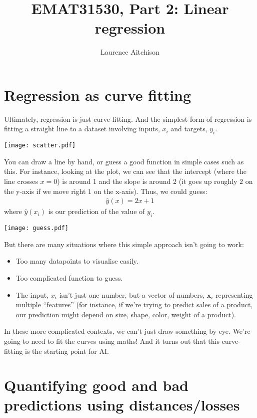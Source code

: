 \documentclass{article}
\title{EMAT31530, Part 2: Linear regression}
\author{Laurence Aitchison}
\date{}
\newcommand{\x}{\mathbf{x}}
\begin{document}
\maketitle

\section{Regression as curve fitting}
Ultimately, regression is just curve-fitting.
And the simplest form of regression is fitting a straight line to a dataset involving inputs, $x_i$ and targets, $y_i$.
\begin{center}
  \texttt{[image: scatter.pdf]}
\end{center}
You can draw a line by hand, or guess a good function in simple cases such as this.
For instance, looking at the plot, we can see that the intercept (where the line crosses $x=0$) is around 1 and the slope is around 2 (it goes up roughly $2$ on the y-axis if we move right $1$ on the x-axis).
Thus, we could guess:
\begin{align}
  \hat{y}(x) = 2 x + 1
\end{align}
where $\hat{y}(x_i)$ is our prediction of the value of $y_i$.
\begin{center}
  \texttt{[image: guess.pdf]}
\end{center}
But there are many situations where this simple approach isn't going to work:
\begin{itemize}
  \item Too many datapoints to visualise easily.
  \item Too complicated function to guess.
  \item The input, $x_i$ isn't just one number, but a vector of numbers, $\x_i$ representing multiple ``features'' (for instance, if we're trying to predict sales of a product, our prediction might depend on size, shape, color, weight of a product).
\end{itemize}
In these more complicated contexts, we can't just draw something by eye.
We're going to need to fit the curves using maths!
And it turns out that this curve-fitting is the starting point for AI.

\section{Quantifying good and bad predictions using distances/losses}
\end{document}
